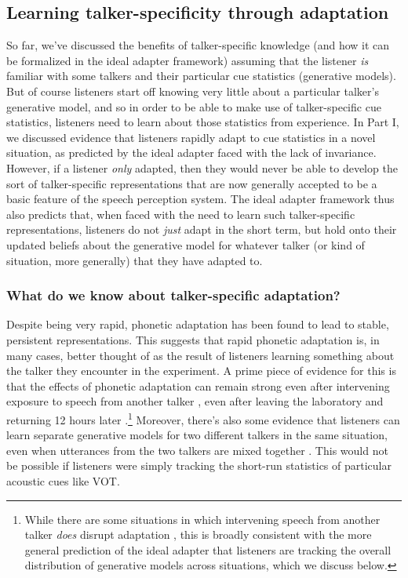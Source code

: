 \subsection{Learning talker-specificity through adaptation}
\label{sec:learn-talk-spec}

So far, we've discussed the benefits of talker-specific knowledge (and how it can be formalized in the ideal adapter framework) assuming that the listener \emph{is} familiar with some talkers and their particular cue statistics (generative models).  But of course listeners start off knowing very little about a particular talker's generative model, and so in order to be able to make use of talker-specific cue statistics, listeners need to learn about those statistics from experience.  In Part I, we discussed evidence that listeners rapidly adapt to cue statistics in a novel situation, as predicted by the ideal adapter faced with the lack of invariance.  However, if a listener \emph{only} adapted, then they would never be able to develop the sort of talker-specific representations that are now generally accepted to be a basic feature of the speech perception system.  The ideal adapter framework thus also predicts that, when faced with the need to learn such talker-specific representations, listeners do not \emph{just} adapt in the short term, but hold onto their updated beliefs about the generative model for whatever talker (or kind of situation, more generally) that they have adapted to.  

\subsubsection{What do we know about talker-specific adaptation?}
\label{sec:what-do-we-know-talker-adapt}

Despite being very rapid, phonetic adaptation has been found to lead to stable, persistent representations.  This suggests that rapid phonetic adaptation is, in many cases, better thought of as the result of listeners learning something about the talker they encounter in the experiment.  A prime piece of evidence for this is that the effects of phonetic adaptation can remain strong even after intervening exposure to speech from another talker \autocite{Kraljic2005,Kraljic2007}, even after leaving the laboratory and returning 12 hours later \autocite{Eisner2006}.\footnote{While there are some situations in which intervening speech from another talker \emph{does} disrupt adaptation \autocite[e.g. the \ph d-\ph t condition in][]{Kraljic2007}, this is broadly consistent with the more general prediction of the ideal adapter that listeners are tracking the overall distribution of generative models across situations, which we discuss below.}  Moreover, there's also some evidence that listeners can learn separate generative models for two different talkers in the same situation, even when utterances from the two talkers are mixed together \autocite{Munson2011}.  This would not be possible if listeners were simply tracking the short-run statistics of particular acoustic cues like VOT.

